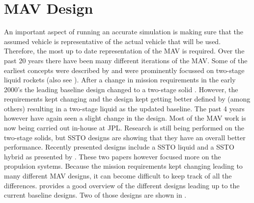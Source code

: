 \section{\ac{MAV} Design}
\label{sec:mavDesign}
An important aspect of running an accurate simulation is making sure that the assumed vehicle is representative of the actual vehicle that will be used. Therefore, the most up to date representation of the \ac{MAV} is required. Over the past 20 years there have been many different iterations of the \ac{MAV}. Some of the earliest concepts were described by \cite{whitehead1997,guernsey1998,desai1998,stone1999} and were prominently focussed on two-stage liquid rockets (also see ). After a change in mission requirements in the early 2000's the leading baseline design changed to a two-stage solid \citep{stephenson2002,whitehead2005,stephenson2006}. However, the requirements kept changing and the design kept getting better defined by (among others) \cite{sengupta2012,trinidad2012,mungas2012,mppg2012} resulting in a two-stage liquid as the updated baseline. The past 4 years however have again seen a slight change in the design. Most of the \ac{MAV} work is now being carried out in-house at \ac{JPL}. Research is still being performed on the two-stage solids, but \ac{SSTO} designs are showing that they have an overall better performance. Recently presented designs include a \ac{SSTO} liquid \citep{vaughan2016technology} and a \ac{SSTO} hybrid as presented by \cite{karp2016technology}. These two papers however focused more on the propulsion systems. Because the mission requirements kept changing leading to many different \ac{MAV} designs, it can become difficult to keep track of all the differences. \cite{shotwell2016history} provides a good overview of the different designs leading up to the current baseline designs. Two of those designs are shown in . \\ 


